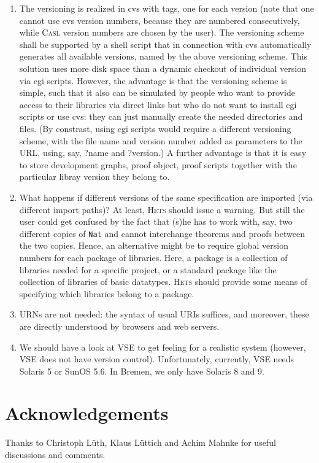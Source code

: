 \documentclass{article}
\newcommand{\CASL}{\textmd{\textsc{Casl}}\xspace }
\newcommand{\Hets}{\textmd{\textsc{Hets}}\xspace }
\begin{document}
\begin{enumerate}
\item The versioning is realized in cvs with tags, one for each version
(note that one cannot use cvs version numbers, because they are numbered
consecutively, while \CASL version numbers are chosen by the user).
The versioning scheme shall be supported by a shell script that in
connection with cvs automatically generates all available
versions, named by the above versioning scheme.
This solution uses more disk space than a dynamic checkout
of individual version via cgi scripts. However, the advantage
is that the versioning scheme is simple, such that it also
can be simulated by people who want to provide access to their
libraries via direct links but who do not want to install cgi
scripts or use cvs: they can just manually create the needed directories
and files. (By constrast, using cgi scripts would require
a different versioning scheme, with the file name and version
number added as parameters to the URL, using, say, ?name and ?version.)
A further advantage is that it is easy to store 
development graphs, proof object, proof scripts
together with the particular libray version they belong to.

\item What happens if different versions of the same specification
are imported (via different import paths)? At least, \Hets
should issue a warning. But still the user could get confused
by the fact that (s)he has to work with, say, two different
copies of \texttt{Nat} and cannot interchange theorems and proofs
between the two copies. Hence, an alternative might be to
require global version numbers for each package of libraries.
Here, a package is a collection of libraries needed for a specific
project, or a standard package like the collection of libraries
of basic datatypes.  \Hets should provide some means of
specifying which libraries belong to a package.

\item URNs are not needed: the syntax of usual URIs suffices, and moreover,
these are directly understood by browsers and web servers.

\item We should have a look at VSE to get feeling for a realistic system
(however, VSE does not have version control).
Unfortunately, currently, VSE needs Solaris 5 or SunOS 5.6. In Bremen, we only have Solaris 8 and 9.


\end{enumerate}

\section*{Acknowledgements}
Thanks to Christoph L\"uth, Klaus L\"uttich and Achim Mahnke for
useful discussions and comments.
\end{document}
